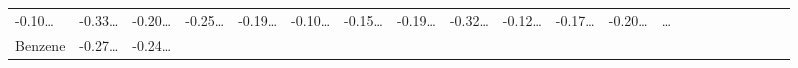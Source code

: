 \documentclass[
]{article}
\begin{document}
\begin{longtable}[]{@{}lllllllllllllllllllll@{}}
\begin{minipage}[t]{0.03\columnwidth}
-0.10\ldots{}\strut
\end{minipage} & \begin{minipage}[t]{0.03\columnwidth}\raggedright
-0.33\ldots{}\strut
\end{minipage} & \begin{minipage}[t]{0.03\columnwidth}\raggedright
-0.20\ldots{}\strut
\end{minipage} & \begin{minipage}[t]{0.03\columnwidth}\raggedright
-0.25\ldots{}\strut
\end{minipage} & \begin{minipage}[t]{0.03\columnwidth}\raggedright
-0.19\ldots{}\strut
\end{minipage} & \begin{minipage}[t]{0.03\columnwidth}\raggedright
-0.10\ldots{}\strut
\end{minipage} & \begin{minipage}[t]{0.03\columnwidth}\raggedright
-0.15\ldots{}\strut
\end{minipage} & \begin{minipage}[t]{0.03\columnwidth}\raggedright
-0.19\ldots{}\strut
\end{minipage} & \begin{minipage}[t]{0.03\columnwidth}\raggedright
-0.32\ldots{}\strut
\end{minipage} & \begin{minipage}[t]{0.03\columnwidth}\raggedright
-0.12\ldots{}\strut
\end{minipage} & \begin{minipage}[t]{0.03\columnwidth}\raggedright
-0.17\ldots{}\strut
\end{minipage} & \begin{minipage}[t]{0.03\columnwidth}\raggedright
-0.20\ldots{}\strut
\end{minipage} & \begin{minipage}[t]{0.01\columnwidth}\raggedright
\ldots{}\strut
\end{minipage}\tabularnewline
\begin{minipage}[t]{0.03\columnwidth}\raggedright
Benzene\strut
\end{minipage} & \begin{minipage}[t]{0.03\columnwidth}\raggedright
-0.27\ldots{}\strut
\end{minipage} & \begin{minipage}[t]{0.03\columnwidth}\raggedright
-0.24\ldots{}\strut
\end{minipage} & \begin{minipage}[t]{0.03\columnwidth}\raggedright

\end{minipage}
\end{longtable}
\end{document}
